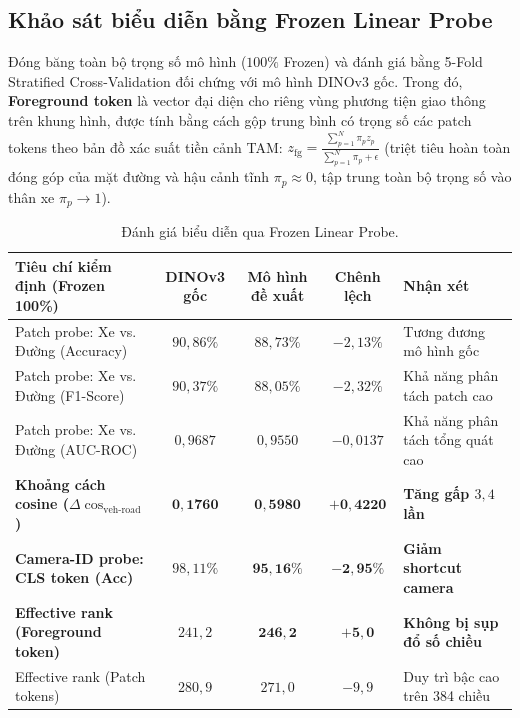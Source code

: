 \documentclass[11pt,a4paper]{article}
\begin{document}
\subsection{Khảo sát biểu diễn bằng Frozen Linear Probe}
Đóng băng toàn bộ trọng số mô hình ($100\%$ Frozen) và đánh giá bằng 5-Fold Stratified Cross-Validation đối chứng với mô hình DINOv3 gốc. Trong đó, \textbf{Foreground token} là vector đại diện cho riêng vùng phương tiện giao thông trên khung hình, được tính bằng cách gộp trung bình có trọng số các patch tokens theo bản đồ xác suất tiền cảnh TAM: $z_{\text{fg}} = \frac{\sum_{p=1}^N \pi_p z_p}{\sum_{p=1}^N \pi_p + \epsilon}$ (triệt tiêu hoàn toàn đóng góp của mặt đường và hậu cảnh tĩnh $\pi_p \approx 0$, tập trung toàn bộ trọng số vào thân xe $\pi_p \to 1$).

\begin{table}[H]
\centering
\small
\renewcommand{\arraystretch}{0.95}
\caption{Đánh giá biểu diễn qua Frozen Linear Probe.}
\label{tab:probe_results}
\begin{tabularx}{\textwidth}{>{\raggedright\arraybackslash}X ccc >{\raggedright\arraybackslash}p{4.8cm}}
\toprule
\textbf{Tiêu chí kiểm định (Frozen 100\%)} & \textbf{DINOv3 gốc} & \textbf{Mô hình đề xuất} & \textbf{Chênh lệch} & \textbf{Nhận xét} \\
\midrule
Patch probe: Xe vs. Đường (Accuracy) & $90{,}86\%$ & $88{,}73\%$ & $-2{,}13\%$ & Tương đương mô hình gốc \\
Patch probe: Xe vs. Đường (F1-Score) & $90{,}37\%$ & $88{,}05\%$ & $-2{,}32\%$ & Khả năng phân tách patch cao \\
Patch probe: Xe vs. Đường (AUC-ROC) & $0{,}9687$ & $0{,}9550$ & $-0{,}0137$ & Khả năng phân tách tổng quát cao \\
\midrule
\textbf{Khoảng cách cosine ($\Delta\cos_{\text{veh-road}}$)} & $\mathbf{0{,}1760}$ & $\mathbf{0{,}5980}$ & $\mathbf{+0{,}4220}$ & \textbf{Tăng gấp $3{,}4$ lần} \\
\textbf{Camera-ID probe: CLS token (Acc)} & $98{,}11\%$ & $\mathbf{95{,}16\%}$ & $\mathbf{-2{,}95\%}$ & \textbf{Giảm shortcut camera} \\
\midrule
\textbf{Effective rank (Foreground token)} & $241{,}2$ & $\mathbf{246{,}2}$ & $\mathbf{+5{,}0}$ & \textbf{Không bị sụp đổ số chiều} \\
Effective rank (Patch tokens) & $280{,}9$ & $271{,}0$ & $-9{,}9$ & Duy trì bậc cao trên 384 chiều \\
\bottomrule
\end{tabularx}
\end{table}
\end{document}
